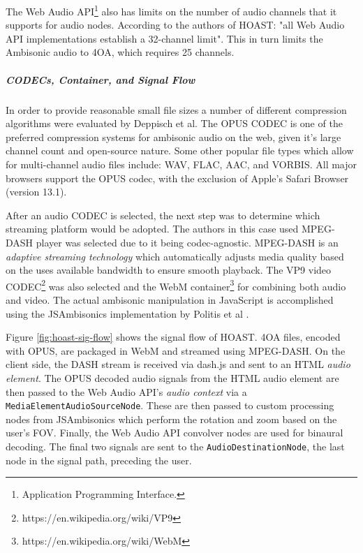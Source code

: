 The Web Audio API\footnote{Application Programming Interface.} also has limits on the number of audio channels that it supports for audio nodes. According to the authors of HOAST: "all Web Audio API implementations establish a 32-channel limit". This in turn limits the Ambisonic audio to 4OA, which requires 25 channels. 

\subparagraph{CODECs, Container, and Signal Flow}

In order to provide reasonable small file sizes a number of different compression algorithms were evaluated by Deppisch et al. The OPUS CODEC is one of the preferred compression systems for ambisonic audio on the web, given it's large channel count and open-source nature. Some other popular file types which allow for multi-channel audio files include: WAV, FLAC, AAC, and VORBIS. All major browsers support the OPUS codec, with the exclusion of Apple's Safari Browser (version 13.1). 

After an audio CODEC is selected, the next step was to determine which streaming platform would be adopted. The authors in this case used MPEG-DASH player was selected due to it being codec-agnostic. MPEG-DASH is an \textit{adaptive streaming technology} which automatically adjusts media quality based on the uses available bandwidth to ensure smooth playback. The VP9 video CODEC\footnote{https://en.wikipedia.org/wiki/VP9} was also selected and the WebM container\footnote{https://en.wikipedia.org/wiki/WebM} for combining both audio and video. The actual ambisonic manipulation in JavaScript is accomplished using the JSAmbisonics implementation by Politis et al \cite{politis2016jsambisonics}.

Figure \ref{fig:hoast-sig-flow} shows the signal flow of HOAST. 4OA files, encoded with OPUS, are packaged in WebM and streamed using MPEG-DASH. On the client side, the DASH stream is received via dash.js and sent to an HTML \textit{audio element}. The OPUS decoded audio signals from the HTML audio element are then passed to the Web Audio API's \textit{audio context} via a \texttt{MediaElementAudioSourceNode}. These are then passed to custom processing nodes from JSAmbisonics \cite{politis2016jsambisonics} which perform the rotation and zoom based on the user's FOV. Finally, the Web Audio API convolver nodes are used for binaural decoding. The final two signals are sent to the \texttt{AudioDestinationNode}, the last node in the signal path, preceding the user. 

